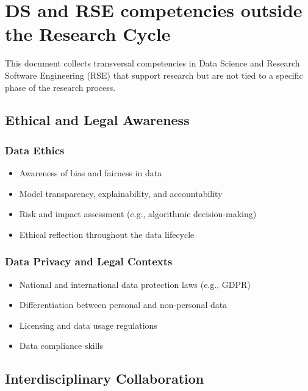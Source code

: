 \documentclass[
        english,biblatex
    ]{lni}
\providecommand{\tightlist}{%
    \setlength{\itemsep}{0pt}\setlength{\parskip}{0pt}}
\begin{document}
    \section{DS and RSE competencies outside the Research
    Cycle}\label{ds-and-rse-competencies-outside-the-research-cycle}

    This document collects transversal competencies in Data Science and
    Research Software Engineering (RSE) that support research but are
    not tied to a specific phase of the research process.

    \subsection{Ethical and Legal
    Awareness}\label{ethical-and-legal-awareness}

    \subsubsection{Data Ethics}\label{data-ethics}

    \begin{itemize}
    \tightlist
    \item
      Awareness of bias and fairness in data
    \item
      Model transparency, explainability, and accountability
    \item
      Risk and impact assessment (e.g., algorithmic decision-making)
    \item
      Ethical reflection throughout the data lifecycle
    \end{itemize}

    \subsubsection{Data Privacy and Legal
    Contexts}\label{data-privacy-and-legal-contexts}

    \begin{itemize}
    \tightlist
    \item
      National and international data protection laws (e.g., GDPR)
    \item
      Differentiation between personal and non-personal data
    \item
      Licensing and data usage regulations
    \item
      Data compliance skills
    \end{itemize}

    \subsection{Interdisciplinary
    Collaboration}\label{interdisciplinary-collaboration}
\end{document}
